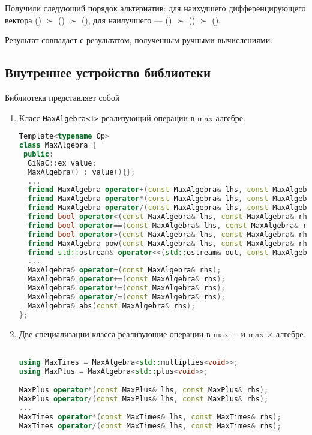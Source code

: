 \documentclass[specialist,
	substylefile = spbu_report.rtx,
	subf,href,colorlinks=true, 12pt]{disser}
\begin{document}
Получили следующий порядок альтернатив:
для наихудшего дифференцирующего вектора () \(\succ\) () \(\succ\) (),
для наилучшего --- () \(\succ\) () \(\succ\) ().

Результат совпадает с результатом, полученным ручными вычислениями.

\subsection{Внутреннее устройство библиотеки}
Библиотека представляет собой
\begin{enumerate}
	\item Класс \texttt{MaxAlgebra<T>} реализующий операции в max-алгебре.

\begin{lstlisting}[language=C++,basicstyle=\footnotesize\ttfamily,keywordstyle=\color{blue}]
Template<typename Op>
class MaxAlgebra {
 public:
  GiNaC::ex value;
  MaxAlgebra() : value(){};
  ...
  friend MaxAlgebra operator+(const MaxAlgebra& lhs, const MaxAlgebra& rhs);
  friend MaxAlgebra operator*(const MaxAlgebra& lhs, const MaxAlgebra& rhs);
  friend MaxAlgebra operator/(const MaxAlgebra& lhs, const MaxAlgebra& rhs);
  friend bool operator<(const MaxAlgebra& lhs, const MaxAlgebra& rhs);
  friend bool operator==(const MaxAlgebra& lhs, const MaxAlgebra& rhs);
  friend bool operator>(const MaxAlgebra& lhs, const MaxAlgebra& rhs);
  friend MaxAlgebra pow(const MaxAlgebra& lhs, const MaxAlgebra& rhs);
  friend std::ostream& operator<<(std::ostream& out, const MaxAlgebra& val);
  ...
  MaxAlgebra& operator=(const MaxAlgebra& rhs);
  MaxAlgebra& operator+=(const MaxAlgebra& rhs);
  MaxAlgebra& operator*=(const MaxAlgebra& rhs);
  MaxAlgebra& operator/=(const MaxAlgebra& rhs);
  MaxAlgebra& abs(const MaxAlgebra& rhs);
};
\end{lstlisting}
\end{enumerate}

\begin{enumerate}
 \setcounter{enumi}{1}
	\item Две специализации класса реализующие операции в max-+ и max-$\times$-алгебре.
\begin{lstlisting}[language=C++,basicstyle=\footnotesize\ttfamily,keywordstyle=\color{blue}]

using MaxTimes = MaxAlgebra<std::multiplies<void>>;
using MaxPlus = MaxAlgebra<std::plus<void>>;

MaxPlus operator*(const MaxPlus& lhs, const MaxPlus& rhs);
MaxPlus operator/(const MaxPlus& lhs, const MaxPlus& rhs);
...
MaxTimes operator*(const MaxTimes& lhs, const MaxTimes& rhs);
MaxTimes operator/(const MaxTimes& lhs, const MaxTimes& rhs);
\end{lstlisting}
\end{enumerate}
\end{document}
